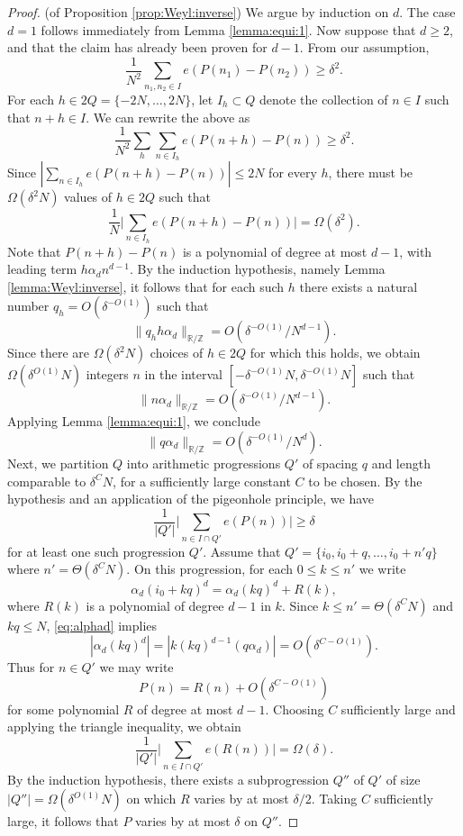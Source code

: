 \documentclass[reqno]{amsart}
\newcommand\R{{\mathbb{R}}}
\newcommand\Z{{\mathbb{Z}}}
\newcommand\al{\alpha}
\theoremstyle{plain}
\theoremstyle{definition}
\begin{document}
\begin{proof}(of Proposition \ref{prop:Weyl:inverse}) We argue by induction on $d$. The case $d=1$ follows immediately from Lemma \ref{lemma:equi:1}. 
Now suppose that $d \ge 2$, and that the claim has already been proven for $d-1$. From our assumption,
\[
\frac{1}{N^{2}} \sum_{n_{1},n_{2} \in I} e(P(n_{1}) - P(n_{2})) \geq \delta^{2}.
\]
For each $h\in 2Q = \{-2N,\dots, 2N\}$, let $I_{h}\subset Q$ denote the collection of $n\in I$ such that $n+h \in I$. We can rewrite the above as 
$$\frac{1}{N^{2}} \sum_{h} \sum_{n \in I_{h}} e(P(n+h) - P(n)) \ge \delta^{2}.$$
Since $| \sum_{n \in I_{h}} e(P(n+h) - P(n)) |\le 2N$ for every $h$, there must be $\Omega(\delta^{2} N)$ values of $h \in 2Q$ such that
\[
\frac{1}{N} \Big|\sum_{n \in I_h} e(P(n+h) - P(n))\Big| = \Omega(\delta^{2}).
\]
Note that $P(n+h)-P(n)$ is a polynomial of degree at most $d-1$, with leading term $h \alpha_d n^{d-1}$. By the induction hypothesis, namely Lemma \ref{lemma:Weyl:inverse}, it follows that for each such $h$ there exists a natural number $q_h =O(\delta^{-O(1)})$ such that 
\[
\|q_h h \alpha_d \|_{\R/\Z} = O(\delta^{-O(1)} / N^{d-1}).
\] 
Since there are $\Omega(\delta^{2} N)$ choices of $h \in 2Q$ for which this holds, we obtain $\Omega(\delta^{O(1)} N)$ integers $n$ in the interval $[-\delta^{-O(1)} N, \delta^{-O(1)}N]$ such that 
\[
\|n \alpha_d \|_{\R/\Z} = O(\delta^{-O(1)} / N^{d-1}).
\] 
Applying Lemma \ref{lemma:equi:1}, we conclude
\begin{equation}\label{eq:alphad}
\| q \alpha_d \|_{\R/\Z} = O(\delta^{-O(1)}/ N^d).
\end{equation}
Next, we partition $Q$ into arithmetic progressions $Q'$ of spacing $q$ and length comparable to $\delta^{C}N$, for a sufficiently large constant $C$ to be chosen. By the hypothesis and an application of the pigeonhole principle, we have
\[
\frac{1}{|Q'|} \Big|\sum_{n \in I \cap Q'} e(P(n))\Big| \geq \delta
\]
for at least one such progression $Q'$. Assume that $Q'=\{i_{0}, i_{0}+q, \dots, i_{0}+ n'q\}$ where $n'= \Theta(\delta^{C}N)$. On this progression, for each $0\le k\le n'$ we write
\[
\al_{d}(i_{0}+kq)^{d} = \al_{d} (kq)^{d} +R(k),
\]
where $R(k)$ is a polynomial of degree $d-1$ in $k$. Since $k\le n' = \Theta(\delta^{C}N)$ and $kq \le N$, \eqref{eq:alphad} implies
\[
|\al_{d} (kq)^{d}| = |k (kq)^{d-1}(q\al_{d})|= O(\delta^{C -O(1)}).
\]
Thus for $n \in Q'$ we may write 
\[
P(n) = R(n) + O(\delta^{C-O(1)})
\] 
for some polynomial $R$ of degree at most $d-1$. Choosing $C$ sufficiently large and applying the triangle inequality, we obtain
\[
\frac{1}{|Q'|} \Big|\sum_{n \in I \cap Q'} e(R(n))\Big|=\Omega(\delta).
\]
By the induction hypothesis, there exists a subprogression $Q''$ of $Q'$ of size $|Q''|=\Omega (\delta^{O(1)} N)$ on which $R$ varies by at most $\delta/2$. Taking $C$ sufficiently large, it follows that $P$ varies by at most $\delta$ on $Q''$.
\end{proof}
\end{document}
